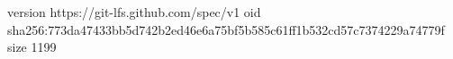 version https://git-lfs.github.com/spec/v1
oid sha256:773da47433bb5d742b2ed46e6a75bf5b585c61ff1b532cd57c7374229a74779f
size 1199
